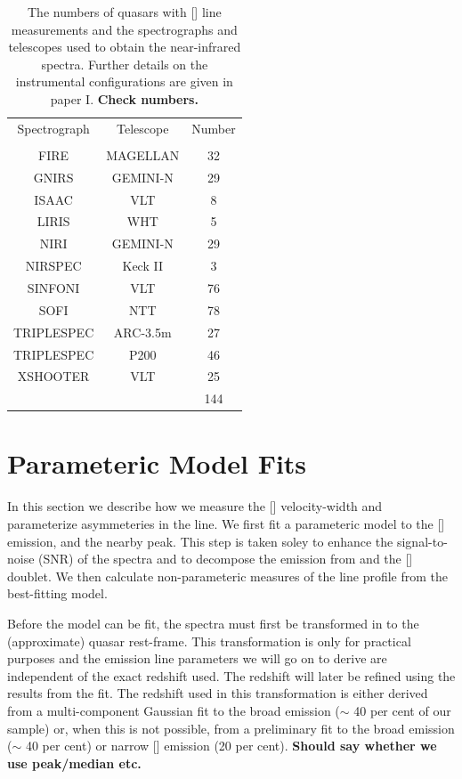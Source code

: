 \begin{table}
  \centering
  \caption{The numbers of quasars with [] line measurements and the spectrographs and telescopes used to obtain the near-infrared spectra. Further details on the instrumental configurations are given in paper I. {\bf Check numbers.} }
  \label{tab:specnums}
    \begin{tabular}{ccc} 
    \hline
    Spectrograph & Telescope & Number \\
                 &           & \\
    \hline
    FIRE         & MAGELLAN  & 32 \\
    GNIRS        & GEMINI-N  & 29 \\
    ISAAC        & VLT       & 8 \\
    LIRIS        & WHT       & 5 \\
    NIRI         & GEMINI-N  & 29 \\
    NIRSPEC      & Keck II   & 3 \\
    SINFONI      & VLT       & 76 \\
    SOFI         & NTT       & 78 \\
    TRIPLESPEC   & ARC-3.5m  & 27 \\
    TRIPLESPEC   & P200      & 46 \\
    XSHOOTER     & VLT       & 25 \\
    \hline
    & & 144 \\
    \hline
    \end{tabular}
\end{table} 


\section{Parameteric Model Fits}

In this section we describe how we measure the [] velocity-width and parameterize asymmeteries in the line. 
We first fit a parameteric model to the [] emission, and the nearby \hb peak.
This step is taken soley to enhance the signal-to-noise (SNR) of the spectra and to decompose the emission from \hb and the [] doublet. 
We then calculate non-parameteric measures of the line profile from the best-fitting model. 

Before the model can be fit, the spectra must first be transformed in to the (approximate) quasar rest-frame. 
This transformation is only for practical purposes and the emission line parameters we will go on to derive are independent of the exact redshift used. 
The redshift will later be refined using the results from the fit. 
The redshift used in this transformation is either derived from a multi-component Gaussian fit to the broad \ha emission ($\sim$ 40 per cent of our sample) or, when this is not possible, from a preliminary fit to the broad \hb emission ($\sim$ 40 per cent) or narrow [] emission (20 per cent). 
{\bf Should say whether we use peak/median etc.}

